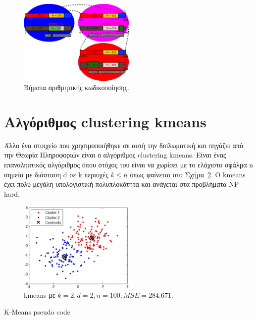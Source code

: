 \begin{itemize}
      \begin{figure}[ht!]
          \centering
          \includegraphics[width=0.5\textwidth]{chapter3/ac.jpg}
          \caption{Βήματα αριθμητικής κωδικοποίησης. \cite{wiki:arcod}}
          \label{fig:ac}
      \end{figure}
\end{itemize}

\newpage
\section{Αλγόριθμος clustering kmeans}
\label{section:sect34}

\indent Άλλο ένα στοιχείο που χρησιμοποιήθηκε σε αυτή την διπλωματική και πηγάζει από την Θεωρία Πληροφοριών είναι ο αλγόριθμος clustering kmeans. Είναι ένας επαναληπτικός αλγόριθμος όπου στόχος του είναι να χωρίσει με το ελάχιστο σφάλμα n σημεία με διάσταση d σε k περιοχές $ k \leq n $ όπως φαίνεται στο Σχήμα~\ref{fig:kmeans}. O kmeans έχει πολύ μεγάλη υπολογιστική πολυπλοκότητα και ανάγεται στα προβλήματα NP-hard.

\begin{figure}[ht]
  \centering
  \includegraphics[width=0.5\textwidth]{chapter3/kmeans.jpg}
  \caption{kmeans με $k=2,d=2,n=100,MSE=284.671$. \cite{misc:kmeans}}
  \label{fig:kmeans}
\end{figure}

\begin{algorithm}[H]
\begin{algorithmic}[1]
 \label{alg:kmeans:s1}
     \label{alg:kmeans:s4}
         \label{alg:kmeans:s5}
    \EndFor
    \EndFor
\EndWhile
\end{algorithmic}
\caption{K-Means pseudo code}
\label{alg:kmeans}
\end{algorithm}

